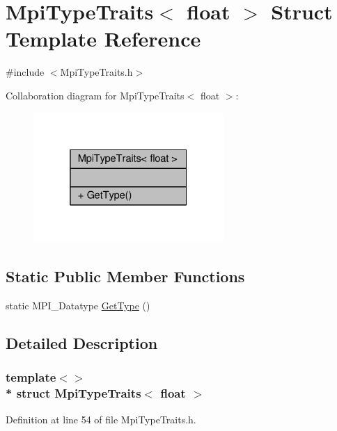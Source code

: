 \hypertarget{structMpiTypeTraits_3_01float_01_4}{}\section{Mpi\+Type\+Traits$<$ float $>$ Struct Template Reference}
\label{structMpiTypeTraits_3_01float_01_4}


{\ttfamily \#include $<$Mpi\+Type\+Traits.\+h$>$}



Collaboration diagram for Mpi\+Type\+Traits$<$ float $>$\+:
\nopagebreak
\begin{figure}[H]
\begin{center}
\leavevmode
\includegraphics[width=205pt]{structMpiTypeTraits_3_01float_01_4__coll__graph}
\end{center}
\end{figure}
\subsection*{Static Public Member Functions}
\begin{DoxyCompactItemize}
\item 
static M\+P\+I\+\_\+\+Datatype \hyperlink{structMpiTypeTraits_3_01float_01_4_a576bffda9ee8c04a7830e11f410ed40e}{Get\+Type} ()
\end{DoxyCompactItemize}


\subsection{Detailed Description}
\subsubsection*{template$<$$>$\\*
struct Mpi\+Type\+Traits$<$ float $>$}



Definition at line 54 of file Mpi\+Type\+Traits.\+h.



